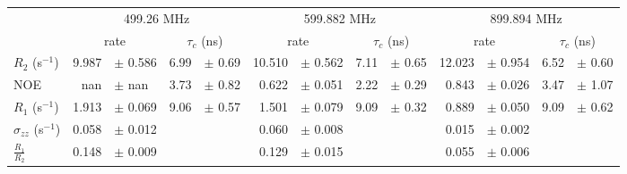 \documentclass[showkeys,aps,prb,prepreint,amssymb, amsmath,nobibnotes]{article}
\begin{document}
\begin{small}
\noindent \begin{tabular}{l|rlrl|rlrl|rlrl}
& \multicolumn{4}{c}{499.26 MHz}& \multicolumn{4}{c}{599.882 MHz}& \multicolumn{4}{c}{899.894 MHz}\\
&  \multicolumn{2}{c}{rate} & \multicolumn{2}{c}{$\tau_c$ (ns)}   &  \multicolumn{2}{c}{rate} & \multicolumn{2}{c}{$\tau_c$ (ns)}   &  \multicolumn{2}{c}{rate} & \multicolumn{2}{c}{$\tau_c$ (ns)}   \\
\hline$R_2$  (s$^{-1}$)  &  9.987 & $\pm$ 0.586   &  6.99 & $\pm$ 0.69 &  10.510 & $\pm$ 0.562   &  7.11 & $\pm$ 0.65 &  12.023 & $\pm$ 0.954   &  6.52 & $\pm$ 0.60 \\
NOE  &  nan & $\pm$ nan   &  3.73 & $\pm$ 0.82 &  0.622 & $\pm$ 0.051   &  2.22 & $\pm$ 0.29 &  0.843 & $\pm$ 0.026   &  3.47 & $\pm$ 1.07 \\
$R_1$ (s$^{-1}$)  &  1.913 & $\pm$ 0.069   &  9.06 & $\pm$ 0.57 &  1.501 & $\pm$ 0.079   &  9.09 & $\pm$ 0.32 &  0.889 & $\pm$ 0.050   &  9.09 & $\pm$ 0.62 \\
$\sigma_{zz}$  (s$^{-1}$)  &  0.058 & $\pm$ 0.012   & & &  0.060 & $\pm$ 0.008   & & &  0.015 & $\pm$ 0.002   & & \\
$\frac{R_1}{R_2}$  &  0.148 & $\pm$ 0.009   & & &  0.129 & $\pm$ 0.015   & & &  0.055 & $\pm$ 0.006   & & \\
\end{tabular}
\end{small}
\end{document}
